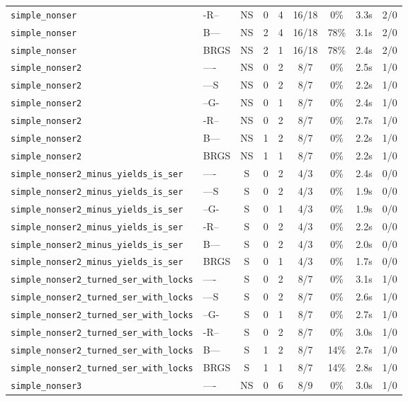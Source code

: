 \begin{tabular}{llccccccc}
\texttt{simple_nonser} & -R-- & NS & 0 & 4 & 16/18 & 0\% & 3.3s & 2/0 \\
\texttt{simple_nonser} & B--- & NS & 2 & 4 & 16/18 & 78\% & 3.1s & 2/0 \\
\texttt{simple_nonser} & BRGS & NS & 2 & 1 & 16/18 & 78\% & 2.4s & 2/0 \\
\texttt{simple_nonser2} & ---- & NS & 0 & 2 & 8/7 & 0\% & 2.5s & 1/0 \\
\texttt{simple_nonser2} & ---S & NS & 0 & 2 & 8/7 & 0\% & 2.2s & 1/0 \\
\texttt{simple_nonser2} & --G- & NS & 0 & 1 & 8/7 & 0\% & 2.4s & 1/0 \\
\texttt{simple_nonser2} & -R-- & NS & 0 & 2 & 8/7 & 0\% & 2.7s & 1/0 \\
\texttt{simple_nonser2} & B--- & NS & 1 & 2 & 8/7 & 0\% & 2.2s & 1/0 \\
\texttt{simple_nonser2} & BRGS & NS & 1 & 1 & 8/7 & 0\% & 2.2s & 1/0 \\
\texttt{simple_nonser2_minus_yields_is_ser} & ---- & S & 0 & 2 & 4/3 & 0\% & 2.4s & 0/0 \\
\texttt{simple_nonser2_minus_yields_is_ser} & ---S & S & 0 & 2 & 4/3 & 0\% & 1.9s & 0/0 \\
\texttt{simple_nonser2_minus_yields_is_ser} & --G- & S & 0 & 1 & 4/3 & 0\% & 1.9s & 0/0 \\
\texttt{simple_nonser2_minus_yields_is_ser} & -R-- & S & 0 & 2 & 4/3 & 0\% & 2.2s & 0/0 \\
\texttt{simple_nonser2_minus_yields_is_ser} & B--- & S & 0 & 2 & 4/3 & 0\% & 2.0s & 0/0 \\
\texttt{simple_nonser2_minus_yields_is_ser} & BRGS & S & 0 & 1 & 4/3 & 0\% & 1.7s & 0/0 \\
\texttt{simple_nonser2_turned_ser_with_locks} & ---- & S & 0 & 2 & 8/7 & 0\% & 3.1s & 1/0 \\
\texttt{simple_nonser2_turned_ser_with_locks} & ---S & S & 0 & 2 & 8/7 & 0\% & 2.6s & 1/0 \\
\texttt{simple_nonser2_turned_ser_with_locks} & --G- & S & 0 & 1 & 8/7 & 0\% & 2.7s & 1/0 \\
\texttt{simple_nonser2_turned_ser_with_locks} & -R-- & S & 0 & 2 & 8/7 & 0\% & 3.0s & 1/0 \\
\texttt{simple_nonser2_turned_ser_with_locks} & B--- & S & 1 & 2 & 8/7 & 14\% & 2.7s & 1/0 \\
\texttt{simple_nonser2_turned_ser_with_locks} & BRGS & S & 1 & 1 & 8/7 & 14\% & 2.8s & 1/0 \\
\texttt{simple_nonser3} & ---- & NS & 0 & 6 & 8/9 & 0\% & 3.0s & 1/0 \\

\end{tabular}
